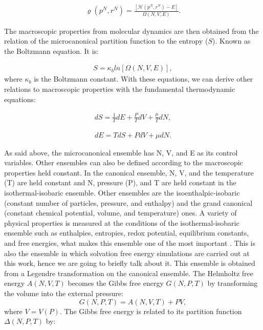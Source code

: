 \begin{equation}
\begin{aligned}
\varrho (p^{N},r^{N}) = \frac{[\mathcal{H}(p^{N},r^{N}) -E]}{ \Omega (N,V,E)} .
\end{aligned}
\end{equation}

The macroscopic properties from molecular dynamics are then obtained from the relation of the microcanonical partition function to the entropy ($S$). Known as the Boltzmann equation. It is:

\begin{equation}
\begin{aligned}
S = \kappa_{b} ln [\Omega (N,V,E)], 
\end{aligned}
\end{equation}
where $\kappa_{b}$ is the Boltzmann constant. With these equations, we can derive other relations to macroscopic properties with the fundamental thermodynamic equations:

\begin{equation}
\begin{aligned}
dS = \frac{1}{T} dE + \frac{P}{T} dV + \frac{\mu}{T} dN,
\end{aligned}
\end{equation}

\begin{equation}
\begin{aligned}
dE = T dS + P dV + \mu dN .
\end{aligned}
\end{equation}

As said above, the microcanonical ensemble  has  N, V, and E as its control variables. Other ensembles can also be defined according to the macroscopic properties held constant.  In the canonical ensemble,  N, V, and the temperature (T) are held constant and  N, pressure (P), and T are held constant in the isothermal-isobaric ensemble. Other ensembles are the isoenthalpic-isobaric (constant number of particles, pressure, and enthalpy) and the grand canonical (constant chemical potential, volume, and temperature) ones. A variety of physical properties is measured at the conditions of the isothermal-isobaric ensemble such as enthalpies, entropies, redox potential, equilibrium constants, and free energies, what makes this ensemble one of the most important \cite{tuckerman}. This is also the ensemble in which solvation free energy simulations are carried out at this work, hence we are going to briefly talk about it. This ensemble is obtained from a Legendre transformation on the canonical ensemble. The Helmholtz free energy $A(N,V,T)$ becomes the Gibbs free energy $G(N,P,T)$ by transforming the volume into the external pressure:
\begin{equation}
G(N,P,T) = A(N,V,T) + PV,
\end{equation}
where $V = V(P)$. The Gibbs free energy is related to its partition function $\Delta (N,P,T)$ by:

